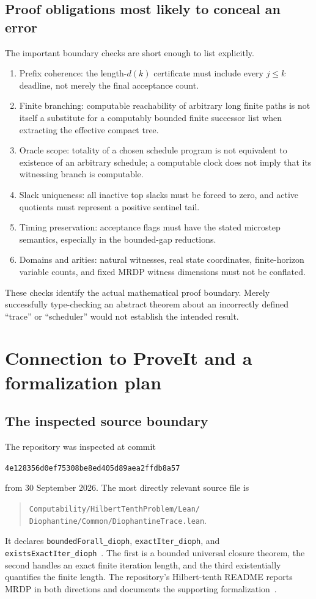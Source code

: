 \documentclass[11pt,letterpaper]{article}
\theoremstyle{definition}
\theoremstyle{remark}
\newcommand{\sha}{\texttt{4e128356d0ef75308be8ed405d89aea2ffdb8a57}}
\newcommand{\1}{\mathbf 1}
\newcommand{\srctag}[1]{\texorpdfstring{\hspace{0.4em}{\normalfont\small\color{accent}[source #1]}}{ [source #1]}}
\begin{document}
\subsection{Proof obligations most likely to conceal an error}
The important boundary checks are short enough to list explicitly.
\begin{enumerate}[label=\textnormal{(\arabic*)}]
\item Prefix coherence: the length-$d(k)$ certificate must include every
$j\le k$ deadline, not merely the final acceptance count.
\item Finite branching: computable reachability of arbitrary long finite
paths is not itself a substitute for a computably bounded finite successor
list when extracting the effective compact tree.
\item Oracle scope: totality of a chosen schedule program is not equivalent
to existence of an arbitrary schedule; a computable clock does not imply
that its witnessing branch is computable.
\item Slack uniqueness: all inactive top slacks must be forced to zero,
and active quotients must represent a positive sentinel tail.
\item Timing preservation: acceptance flags must have the stated microstep
semantics, especially in the bounded-gap reductions.
\item Domains and arities: natural witnesses, real state coordinates,
finite-horizon variable counts, and fixed MRDP witness dimensions must not
be conflated.
\end{enumerate}
These checks identify the actual mathematical proof boundary. Merely
successfully type-checking an abstract theorem about an incorrectly defined
``trace'' or ``scheduler'' would not establish the intended result.
\section{Connection to ProveIt and a formalization plan\srctag{03}}\label{lbh:qd:sec:proveit}

\subsection{The inspected source boundary}

The repository was inspected at commit
\begin{center}\small\sha\end{center}
from 30 September 2026. The most directly relevant source file is
\begin{quote}\small
\texttt{Computability/HilbertTenthProblem/Lean/}\\
\texttt{Diophantine/Common/DiophantineTrace.lean}.
\end{quote}
It declares \texttt{boundedForall\_dioph}, \texttt{exactIter\_dioph}, and
\texttt{existsExactIter\_dioph}~\cite{proveit-trace}. The first is a bounded
universal closure theorem, the second handles an exact finite iteration
length, and the third existentially quantifies the finite length.
The repository's Hilbert-tenth README reports MRDP in both directions and
documents the supporting formalization~\cite{qd-proveit-readme}.
\end{document}
